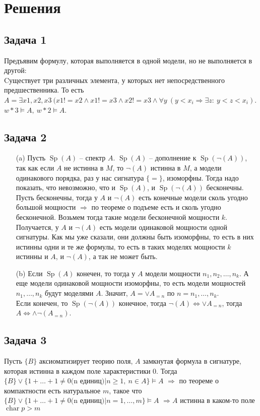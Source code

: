 
\newpage
\section*{Решения}
\subsection*{Задача 1}
	Предъявим формулу, которая выполняется в одной модели, но не выполняется в другой:\\ Cуществует три различных элемента, у которых нет непосредственного предшественника. То есть $A = \exists x1, x2, x3\ (x1 != x2 \wedge x1 != x3 \wedge x2 != x3 \wedge \forall y\ (y < x_i \Rightarrow \exists z:\ y < z < x_i)$. $w*3 \models A,\ w*2 \models A$.
\vskip 0.4in

\subsection*{Задача 2}
\begin{enumerate}
\item[(a)] 
	Пусть $\operatorname{Sp}(A)$ -- спектр $A$. $\operatorname{Sp}(A)$ -- дополнение к $\operatorname{Sp}(\neg(A))$, так как если $A$ не истинна в $M$, то $\neg(A)$ истинна в $M$, а модели одинакового порядка, раз у нас сигнатура $\{=\}$, изоморфны. Тогда надо показать, что невозможно, что и $\operatorname{Sp}(A)$, и $\operatorname{Sp}(\neg(A))$ бесконечны. Пусть бесконечны, тогда у $A$ и $\neg(A)$ есть конечные модели сколь угодно большой мощности $\Rightarrow$ по теореме о подъеме есть и сколь угодно бесконечной. Возьмем тогда такие модели бесконечной мощности $k$. Получается, у $A$ и $\neg(A)$ есть модели одинаковой мощности одной сигнатуры. Как мы уже сказали, они должны быть изоморфны, то есть в них истинны одни и те же формулы, то есть в таких моделях мощности $k$ истинны и $A$, и $\neg(A)$, а так не может быть.
\item[(b)]
	Если $\operatorname{Sp}(A)$ конечен, то тогда у $A$ модели мощности $n_1, n_2, \ldots, n_k$. А еще модели одинаковой мощности изоморфны, то есть модели мощностей $n_1, \ldots, n_k$ будут моделями $A$. Значит, $A = \vee A_{= n}$ по $n = n_1, \ldots, n_k$.\\
	Если конечен, то $\operatorname{Sp}(\neg(A))$ конечное, тогда $\neg(A) \Leftrightarrow \vee A_{=n}$, тогда $A \Leftrightarrow \wedge\neg(A_{=n})$.
\end{enumerate}
\vskip 0.4in

\subsection*{Задача 3}
	Пусть $\{B\}$ аксиоматизирует теорию поля, $A$ замкнутая формула в сигнатуре, которая истинна в каждом поле характеристики $0$. Тогда $\{B\} \vee \{1 + \ldots + 1 \ne 0 \text{(n единиц)} | n \geqslant 1,\ n \in A\} \models A$ $\Rightarrow$ по теореме о компактности есть натуральное $m$, такое что $\{B\} \vee \{1 + \ldots + 1 \ne 0 \text{(n единиц)} | n = 1, \ldots, m\} \models A$ $\Rightarrow A$ истинна в каком-то поле $\operatorname{char} p > m$
\vskip 0.4in


